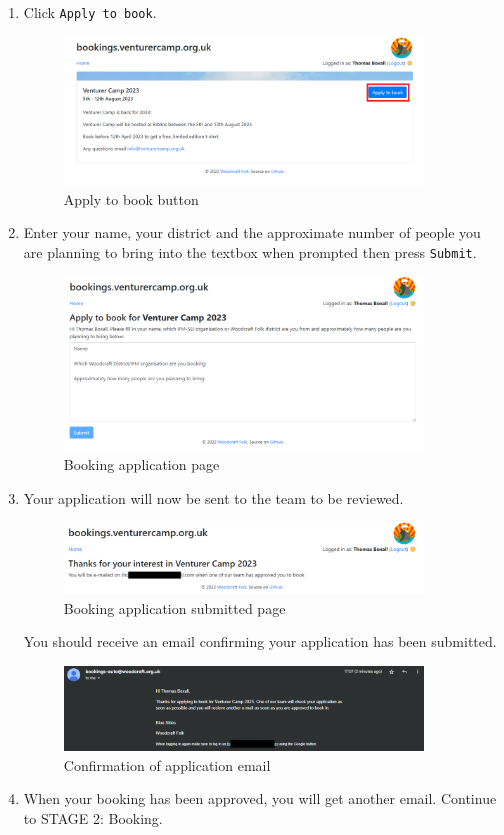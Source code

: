 \begin{enumerate}
    \item Click \verb|Apply to book|.
    \begin{figure}[H]
        \centering
        \includegraphics[width=0.9\textwidth]{assets/apply-to-book.png}
        \caption{Apply to book button}
    \end{figure}
    \item Enter your name, your district and the approximate number of people you are planning to bring into the textbox when prompted then press \verb|Submit|.
    \begin{figure}[H]
        \centering
        \includegraphics[width=0.9\textwidth]{assets/apply-options.png}
        \caption{Booking application page}
    \end{figure}
    \item Your application will now be sent to the team to be reviewed.
    \begin{figure}[H]
        \centering
        \includegraphics[width=0.9\textwidth]{assets/apply-applied.png}
        \caption{Booking application submitted page}
    \end{figure}
    You should receive an email confirming your application has been submitted.
    \begin{figure}[H]
        \centering
        \includegraphics[width=0.9\textwidth]{assets/apply-email.png}
        \caption{Confirmation of application email}
    \end{figure}
    \item When your booking has been approved, you will get another email. Continue to STAGE 2: Booking.
\end{enumerate}